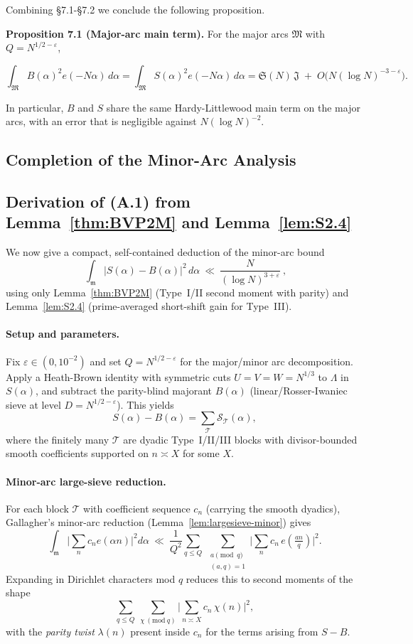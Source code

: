 \documentclass[11pt]{article}
\theoremstyle{definition}
\theoremstyle{remark}
\numberwithin{equation}{part}
\begin{document}
Combining §7.1-§7.2 we conclude the following proposition.

\noindent\textbf{Proposition 7.1 (Major-arc main term).} For the major arcs $\mathfrak M$ with $Q=N^{1/2-\varepsilon}$,

$$
	\int_{\mathfrak M} B(\alpha)^2 e(-N\alpha)\,d\alpha
	=\int_{\mathfrak M} S(\alpha)^2 e(-N\alpha)\,d\alpha
	=\mathfrak S(N)\,\mathfrak J\;+\;O\!\big(N(\log N)^{-3-\varepsilon}\big).
$$

In particular, $B$ and $S$ share the same Hardy-Littlewood main term on the major arcs, with an error that is negligible against $N(\log N)^{-2}$.

\subsection*{Completion of the Minor-Arc Analysis}

\subsection*{Derivation of \texorpdfstring{(A.1)}{(A.1)} from Lemma~\ref{thm:BVP2M} and Lemma~\ref{lem:S2.4}}

We now give a compact, self-contained deduction of the minor-arc bound
\[
	\boxed{\ \ \int_{\mathfrak m}\!\bigl|S(\alpha)-B(\alpha)\bigr|^{2}\,d\alpha
		\ \ll\ \frac{N}{(\log N)^{3+\varepsilon}}\ ,\ }
	\tag{A.1}
\]
using only Lemma~\ref{thm:BVP2M} (Type~I/II second moment with parity) and Lemma~\ref{lem:S2.4} (prime-averaged short-shift gain for Type~III).

\paragraph{Setup and parameters.}
Fix $\varepsilon\in(0,10^{-2})$ and set $Q=N^{1/2-\varepsilon}$ for the major/minor arc decomposition.
Apply a Heath-Brown identity with symmetric cuts $U=V=W=N^{1/3}$ to $\Lambda$ in $S(\alpha)$, and subtract the parity-blind majorant $B(\alpha)$ (linear/Rosser-Iwaniec sieve at level $D=N^{1/2-\varepsilon}$).
This yields
\[
	S(\alpha)-B(\alpha)=\sum_{\mathcal T}\mathcal S_{\mathcal T}(\alpha),
\]
where the finitely many $\mathcal T$ are dyadic Type~I/II/III blocks with divisor-bounded smooth coefficients supported on $n\asymp X$ for some $X$.

\paragraph{Minor-arc large-sieve reduction.}
For each block $\mathcal T$ with coefficient sequence $c_n$ (carrying the smooth dyadics), Gallagher’s minor-arc reduction (Lemma~\ref{lem:largesieve-minor}) gives
\[
	\int_{\mathfrak m}\Big|\sum_n c_n e(\alpha n)\Big|^2 d\alpha
	\ \ll\ \frac{1}{Q^2}\sum_{q\le Q}\ \sum_{\substack{a\!\!\!\!\pmod q\\(a,q)=1}}
	\Big|\sum_n c_n\,e\!\left(\tfrac{an}{q}\right)\Big|^2.
\]
Expanding in Dirichlet characters mod $q$ reduces this to second moments of the shape
\[
	\sum_{q\le Q}\ \sum_{\chi\ (\mathrm{mod}\ q)}
	\Big|\sum_{n\asymp X} c_n\,\chi(n)\Big|^2,
\]
with the \emph{parity twist} $\lambda(n)$ present inside $c_n$ for the terms arising from $S-B$.
\end{document}
